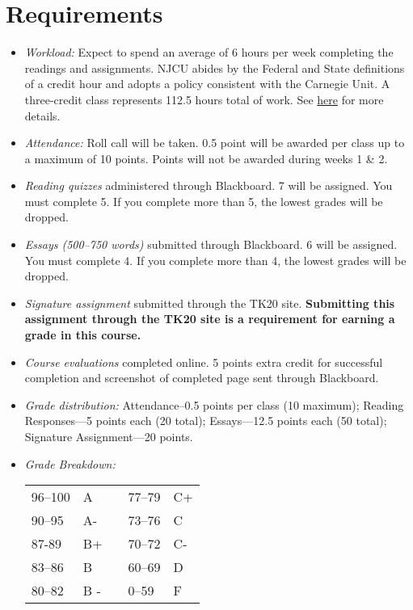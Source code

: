 \documentclass[article,oneside]{memoir}
\begin{document}
\section{Requirements}



\begin{itemize}
\item \textit{Workload:} Expect to spend an average of 6 hours per week completing the readings and assignments. NJCU abides by the Federal and State definitions of a credit hour and adopts a policy consistent with the Carnegie Unit. A three-credit class represents 112.5 hours total of work. See \href{http://scoconno.github.io/Teaching/Credit.pdf}{here} for more details.

\item \textit{Attendance:} Roll call will be taken. 0.5 point will be awarded per class up to a maximum of 10 points. Points will not be awarded during weeks 1 \& 2. 

\item \textit{Reading quizzes} administered through Blackboard. 7 will be assigned. You must complete 5. If you complete more than 5, the lowest grades will be dropped. 


\item \textit{Essays (500--750 words)} submitted through Blackboard.  6 will be assigned. You must complete 4. If you complete more than 4, the lowest grades will be dropped. 

\item \textit{Signature assignment} submitted through the TK20 site. \textbf{Submitting this assignment through the TK20 site is a requirement for earning a grade in this course.}

\item \textit{Course evaluations} completed online. 5 points extra credit for successful completion  and screenshot of completed page sent through Blackboard. 
  
\item \textit{Grade distribution:} Attendance--0.5 points per class (10 maximum); Reading Responses---5 points each (20 total);  Essays---12.5 points each (50 total); Signature Assignment---20 points.


\item \textit{Grade Breakdown:}

 \begin{tabular}{ | l | l | p{2cm} | l | l | }
    \hline 
96--100 & A  & &  77--79 &  C+ \\  
90--95 & A- & &  73--76 & C \\
87-89 & B+ &  &  70--72 & C- \\ 
83--86 & B  & &  60--69 & D\\
80--82 & B - & & 0--59 & F\\ \hline
    \end{tabular}


\end{itemize}
\end{document}
